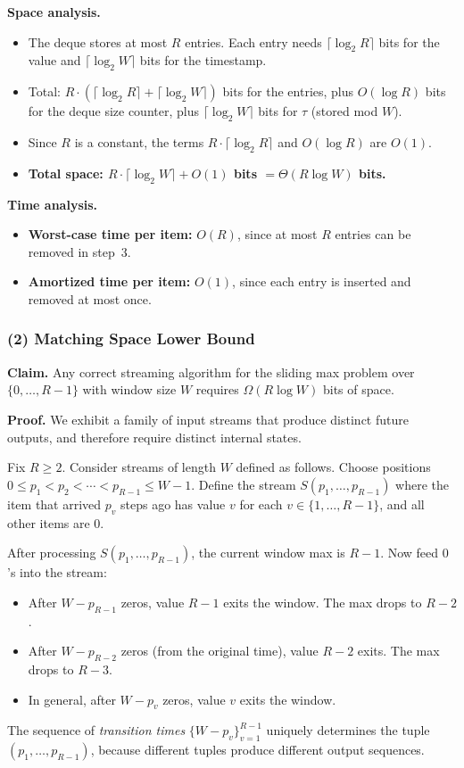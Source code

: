 \documentclass[11pt]{article}
\begin{document}
\textbf{Space analysis.}
\begin{itemize}
\item The deque stores at most $R$ entries. Each entry needs $\lceil \log_2 R \rceil$ bits for the value and $\lceil \log_2 W \rceil$ bits for the timestamp.
\item Total: $R \cdot (\lceil \log_2 R \rceil + \lceil \log_2 W \rceil)$ bits for the entries, plus $O(\log R)$ bits for the deque size counter, plus $\lceil \log_2 W \rceil$ bits for $\tau$ (stored mod $W$).
\item Since $R$ is a constant, the terms $R \cdot \lceil \log_2 R \rceil$ and $O(\log R)$ are $O(1)$.
\item \textbf{Total space: $R \cdot \lceil \log_2 W \rceil + O(1)$ bits $= \Theta(R \log W)$ bits.}
\end{itemize}

\textbf{Time analysis.}
\begin{itemize}
\item \textbf{Worst-case time per item:} $O(R)$, since at most $R$ entries can be removed in step~3.
\item \textbf{Amortized time per item:} $O(1)$, since each entry is inserted and removed at most once.
\end{itemize}

\subsubsection*{(2) Matching Space Lower Bound}

\textbf{Claim.} Any correct streaming algorithm for the sliding max problem over $\{0,\ldots,R-1\}$ with window size $W$ requires $\Omega(R \log W)$ bits of space.

\textbf{Proof.}
We exhibit a family of input streams that produce distinct future outputs, and therefore require distinct internal states.

Fix $R \geq 2$. Consider streams of length $W$ defined as follows. Choose positions $0 \leq p_1 < p_2 < \cdots < p_{R-1} \leq W - 1$. Define the stream $S(p_1, \ldots, p_{R-1})$ where the item that arrived $p_v$ steps ago has value $v$ for each $v \in \{1, \ldots, R-1\}$, and all other items are $0$.

After processing $S(p_1, \ldots, p_{R-1})$, the current window max is $R - 1$. Now feed $0$'s into the stream:
\begin{itemize}
\item After $W - p_{R-1}$ zeros, value $R-1$ exits the window. The max drops to $R-2$.
\item After $W - p_{R-2}$ zeros (from the original time), value $R-2$ exits. The max drops to $R-3$.
\item In general, after $W - p_v$ zeros, value $v$ exits the window.
\end{itemize}
The sequence of \emph{transition times} $\{W - p_v\}_{v=1}^{R-1}$ uniquely determines the tuple $(p_1, \ldots, p_{R-1})$, because different tuples produce different output sequences.
\end{document}
